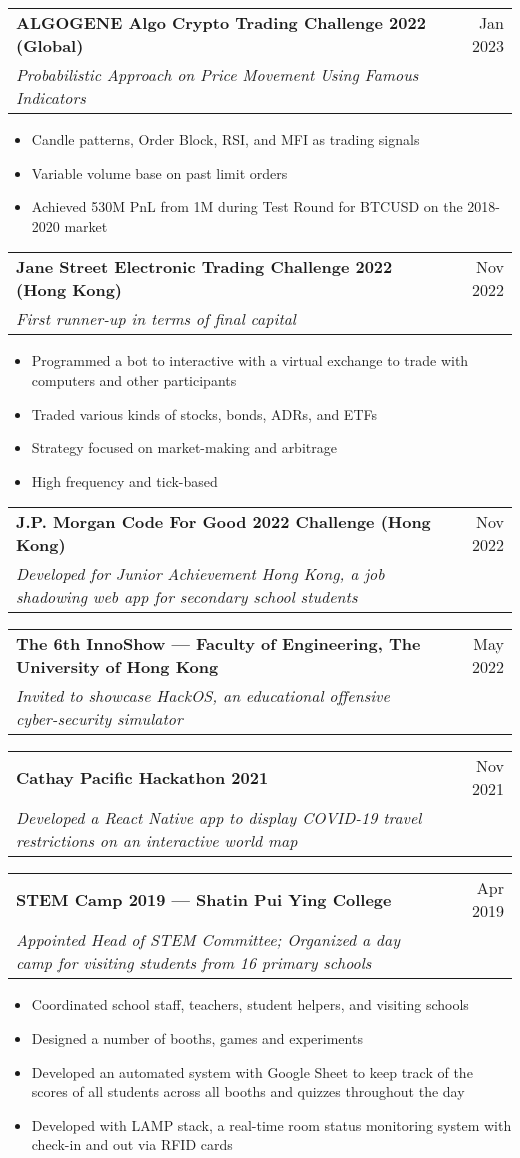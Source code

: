\documentclass{article}
\newcommand{\jobTitle}[3]{
\vspace{0.4cm}
\begin{tabularx}{0.99\linewidth}{ X r }
    \textbf{#1} & #2\\
    \textit{#3} &
\end{tabularx}
\vspace{0.2cm}
}
\newenvironment{descitemize}
{ \begin{itemize}[leftmargin=1.4cm,,topsep=0pt]
    \setlength{\parskip}{0pt}
    \setlength{\parsep}{0pt}     }
{ \end{itemize}                  }
\begin{document}
\jobTitle
{ALGOGENE Algo Crypto Trading Challenge 2022 (Global)}
{Jan 2023}
{Probabilistic Approach on Price Movement Using Famous Indicators}
\begin{descitemize}
    \item Candle patterns, Order Block, RSI, and MFI as trading signals
    \item Variable volume base on past limit orders
    \item Achieved 530M PnL from 1M during Test Round for BTCUSD on the 2018-2020 market
\end{descitemize}

\jobTitle
{Jane Street Electronic Trading Challenge 2022 (Hong Kong)}
{Nov 2022}
{First runner-up in terms of final capital}
\begin{descitemize}
    \item Programmed a bot to interactive with a virtual exchange to trade with computers and other participants
    \item Traded various kinds of stocks, bonds, ADRs, and ETFs
    \item Strategy focused on market-making and arbitrage
    \item High frequency and tick-based
\end{descitemize}

\jobTitle
{J.P. Morgan Code For Good 2022 Challenge (Hong Kong)}
{Nov 2022}
{Developed for Junior Achievement Hong Kong, a job shadowing web app for secondary school students}

\jobTitle
{The 6th InnoShow --- Faculty of Engineering, The University of Hong Kong}
{May 2022}
{Invited to showcase HackOS, an educational offensive cyber-security simulator}

\jobTitle
{Cathay Pacific Hackathon 2021}
{Nov 2021}
{Developed a React Native app to display COVID-19 travel restrictions on an interactive world map}

\jobTitle
{STEM Camp 2019 --- Shatin Pui Ying College}
{Apr 2019}
{Appointed Head of STEM Committee; Organized a day camp for visiting students from 16 primary schools}
\begin{descitemize}
    \item Coordinated school staff, teachers, student helpers, and visiting schools
    \item Designed a number of booths, games and experiments
    \item Developed an automated system with Google Sheet to keep track of the scores of all students across all booths and quizzes throughout the day
    \item Developed with LAMP stack, a real-time room status monitoring system with check-in and out via RFID cards
\end{descitemize}
\end{document}
